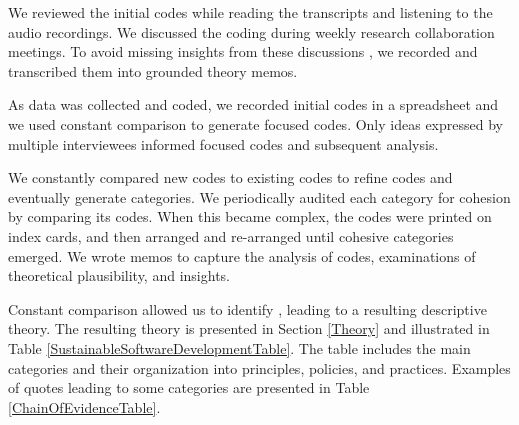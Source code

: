 We reviewed the initial codes while reading the transcripts and listening to the audio recordings. We discussed the coding during weekly research collaboration meetings. To avoid missing insights from these discussions \cite{GlaserTheoreticalSensitivity}, we recorded and transcribed them into grounded theory memos. 

As data was collected and coded, we recorded initial codes in a spreadsheet and we used constant comparison to generate focused codes. Only ideas expressed by multiple interviewees informed focused codes and subsequent analysis. 

We constantly compared new codes to existing codes to refine codes and eventually generate categories. We periodically audited each category for cohesion by comparing its codes. When this became complex, the codes were printed on index cards, and then arranged and re-arranged until cohesive categories emerged. We wrote memos to capture the analysis of codes, examinations of theoretical plausibility, and insights. 

Constant comparison allowed us to identify  \cite{GlaserBasics}, leading to a resulting descriptive theory. The resulting theory is presented in Section \ref{Theory} and illustrated in Table \ref{SustainableSoftwareDevelopmentTable}. The table includes the main categories and their organization into principles, policies, and practices. Examples of quotes leading to some categories are presented in Table \ref{ChainOfEvidenceTable}.


